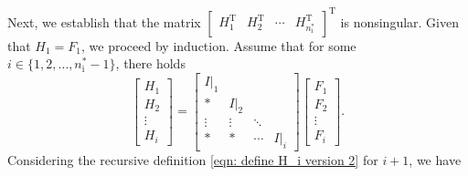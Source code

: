 \documentclass[sort&compress]{elsarticle}
\newcommand\nsharp{n_\mathrm i^*}
\newcommand\T{\mathrm T}
\begin{document}
Next, we establish that the matrix
$\begin{bmatrix}H_1^\T & H_2^\T & \cdots & H_{\nsharp}^\T\end{bmatrix}^\T$
is nonsingular.
Given that $H_1 = F_1$, we proceed by induction. Assume that
for some $i \in \{1, 2, \dots, \nsharp-1\}$, there holds
\begin{equation}\label{eqn: H_i inductive hypothesis}
\begin{bmatrix}H_1\\ H_2\\ \vdots\\ H_i\end{bmatrix}
=\begin{bmatrix}
I|_1&&&\\
*&I|_2&\\
\vdots&\vdots&\ddots&\\
*&*&\cdots&I|_i\end{bmatrix}
\begin{bmatrix}F_1\\ F_2\\ \vdots\\ F_i\end{bmatrix}.
\end{equation}
Considering the recursive definition \eqref{eqn: define H_i version 2} for $i+1$,
we have
\end{document}
